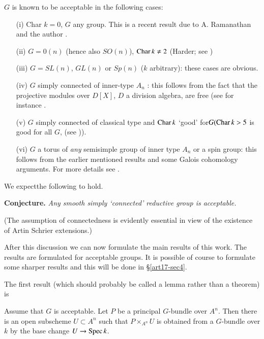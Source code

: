 $G$ is known to be acceptable in the following cases:
\begin{itemize}
\item[(i)] Char $k=0$, $G$ any group. This is a recent result due to A. Ramanathan and the author \cite{art17-key11}.

\item[(ii)] $G = 0(n)$ (hence also $SO(n)$), $\operatorname{Char} k \neq 2$ (Harder; see \cite{art17-key6a})

\item[(iii)] $G = SL(n)$, $GL(n)$ or $Sp(n)$ ($k$ arbitrary): these cases are obvious.

\item[(iv)] $G$ simply connected of inner-type $A_n$ : this follows from the fact that the projective modules over $D[X]$, $D$ a division algebra, are free (see for instance \cite[p. 202]{art17-key15}.

\item[(v)] $G$ simply connected of classical type and $\operatorname{Char} k$ `good' for\break $G (\operatorname{Char} k > 5$ is good for all $G$, (see \cite{art17-key11})).

\item[(vi)] $G$ a torus of {\em any} semisimple group of inner type $A_n$ or a spin group: this follows from the earlier mentioned results and some Galois cohomology arguments. For more details see \cite{art17-key11}.
\end{itemize}

We expect\pageoriginale the following to hold.

\vskip  0.4cm

\noindent
{\bf Conjecture.} {\em Any smooth simply `connected' reductive group is acceptable.}

(The assumption of connectedness is evidently essential in view of the existence of Artin Schrier extensions.)

After this discussion we can now formulate the main results of this work. The results are formulated for acceptable groups. It is possible of course to formulate some sharper results and this will be done in \S \ref{art17-sec4}.

The first result (which should probably be called a lemma rather than a theorem) is 

\begin{alphtheorem}\label{art17-alphthmA}
Assume that $G$ is acceptable. Let $P$ be a principal $G$-bundle over $A^n$. Then there is an open subscheme $U \subset A^n$ such that $P \times_{A^n} U$ is obtained from a $G$-bundle over $k$ by the base change $U \to \operatorname{Spec} k$.
\end{alphtheorem}

